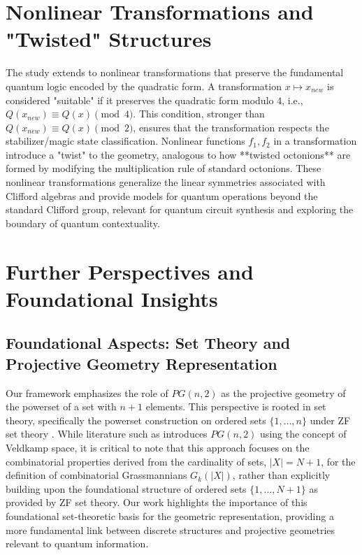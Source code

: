 \documentclass{article}
\begin{document}
\section{Nonlinear Transformations and "Twisted" Structures}
The study extends to nonlinear transformations that preserve the fundamental quantum logic encoded by the quadratic form. A transformation $x \mapsto x_{new}$ is considered "suitable" if it preserves the quadratic form modulo 4, i.e., $Q(x_{new}) \equiv Q(x) \pmod 4$. This condition, stronger than $Q(x_{new}) \equiv Q(x) \pmod 2$, ensures that the transformation respects the stabilizer/magic state classification.
Nonlinear functions $f_1, f_2$ in a transformation introduce a "twist" to the geometry, analogous to how **twisted octonions** are formed by modifying the multiplication rule of standard octonions. \cite{CattoChesley1989Octonions} These nonlinear transformations generalize the linear symmetries associated with Clifford algebras and provide models for quantum operations beyond the standard Clifford group, relevant for quantum circuit synthesis and exploring the boundary of quantum contextuality.

\section{Further Perspectives and Foundational Insights}

\subsection{Foundational Aspects: Set Theory and Projective Geometry Representation}
Our framework emphasizes the role of $PG(n,2)$ as the projective geometry of the powerset of a set with $n+1$ elements. This perspective is rooted in set theory, specifically the powerset construction on ordered sets $\{1, \dots, n\}$ under ZF set theory \cite{ElKhettabi2024Hypercomplex}. While literature such as \cite{Saniga2014CayleyDickson} introduces $PG(n,2)$ using the concept of Veldkamp space, it is critical to note that this approach focuses on the combinatorial properties derived from the cardinality of sets, $|X|=N+1$, for the definition of combinatorial Grassmannians $G_k(|X|)$, rather than explicitly building upon the foundational structure of ordered sets $\{1, \dots, N+1\}$ as provided by ZF set theory. Our work highlights the importance of this foundational set-theoretic basis for the geometric representation, providing a more fundamental link between discrete structures and projective geometries relevant to quantum information.
\end{document}
